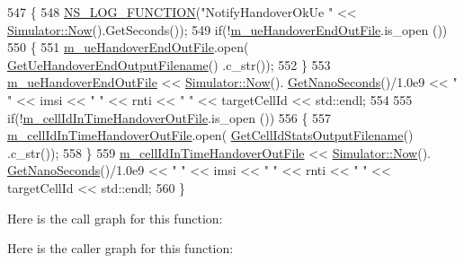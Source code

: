 \begin{DoxyCode}
547 \{
548   \hyperlink{log-macros-disabled_8h_a90b90d5bad1f39cb1b64923ea94c0761}{NS\_LOG\_FUNCTION}(\textcolor{stringliteral}{"NotifyHandoverOkUe "} << \hyperlink{classns3_1_1Simulator_ac3178fa975b419f7875e7105be122800}{Simulator::Now}().GetSeconds());
549   \textcolor{keywordflow}{if}(!\hyperlink{classns3_1_1MmWaveBearerStatsConnector_a76810ed1087b16f420716ad43159337d}{m\_ueHandoverEndOutFile}.is\_open ())
550   \{
551     \hyperlink{classns3_1_1MmWaveBearerStatsConnector_a76810ed1087b16f420716ad43159337d}{m\_ueHandoverEndOutFile}.open(
      \hyperlink{classns3_1_1MmWaveBearerStatsConnector_a6924e5c1c1a1fd59cc93904c83afd88e}{GetUeHandoverEndOutputFilename}() .c\_str());
552   \}
553   \hyperlink{classns3_1_1MmWaveBearerStatsConnector_a76810ed1087b16f420716ad43159337d}{m\_ueHandoverEndOutFile} << \hyperlink{classns3_1_1Simulator_ac3178fa975b419f7875e7105be122800}{Simulator::Now}().
      \hyperlink{classns3_1_1Time_a2fdb7bf0e1f5cd93b6149cb37bbb7f08}{GetNanoSeconds}()/1.0e9 << \textcolor{stringliteral}{" "} << imsi << \textcolor{stringliteral}{" "} << rnti << \textcolor{stringliteral}{" "} << targetCellId << std::endl;
554 
555   \textcolor{keywordflow}{if}(!\hyperlink{classns3_1_1MmWaveBearerStatsConnector_a05031bdd1eb6cbd4f3124e0523dd2b06}{m\_cellIdInTimeHandoverOutFile}.is\_open ())
556   \{
557     \hyperlink{classns3_1_1MmWaveBearerStatsConnector_a05031bdd1eb6cbd4f3124e0523dd2b06}{m\_cellIdInTimeHandoverOutFile}.open(
      \hyperlink{classns3_1_1MmWaveBearerStatsConnector_a47fee985b0824ae54b80e9b81d46d9a1}{GetCellIdStatsOutputFilename}() .c\_str());
558   \}
559   \hyperlink{classns3_1_1MmWaveBearerStatsConnector_a05031bdd1eb6cbd4f3124e0523dd2b06}{m\_cellIdInTimeHandoverOutFile} << \hyperlink{classns3_1_1Simulator_ac3178fa975b419f7875e7105be122800}{Simulator::Now}().
      \hyperlink{classns3_1_1Time_a2fdb7bf0e1f5cd93b6149cb37bbb7f08}{GetNanoSeconds}()/1.0e9 << \textcolor{stringliteral}{" "} << imsi << \textcolor{stringliteral}{" "} << rnti << \textcolor{stringliteral}{" "} << targetCellId << std::endl;
560 \}
\end{DoxyCode}


Here is the call graph for this function\+:




Here is the caller graph for this function\+:


